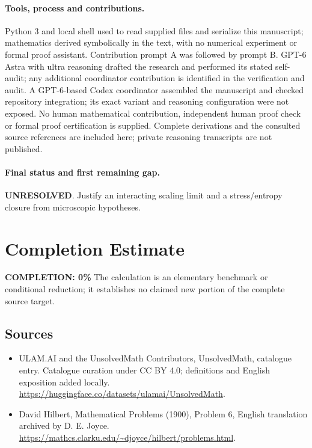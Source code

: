 \documentclass[11pt]{article}
\begin{document}
\paragraph{Tools, process and contributions.}
Python 3 and local shell used to read supplied files and serialize this manuscript; mathematics derived symbolically in the text, with no numerical experiment or formal proof assistant. Contribution prompt A was followed by prompt B. GPT-6 Astra with ultra reasoning drafted the research and performed its stated self-audit; any additional coordinator contribution is identified in the verification and audit. A GPT-6-based Codex coordinator assembled the manuscript and checked repository integration; its exact variant and reasoning configuration were not exposed. No human mathematical contribution, independent human proof check or formal proof certification is supplied. Complete derivations and the consulted source references are included here; private reasoning transcripts are not published.

\paragraph{Final status and first remaining gap.}
\textbf{UNRESOLVED}. Justify an interacting scaling limit and a stress/entropy closure from microscopic hypotheses.

\section{Completion Estimate}
\noindent\textbf{COMPLETION: 0\%}
The calculation is an elementary benchmark or conditional reduction; it establishes no claimed new portion of the complete source target.

\subsection{Sources}
\begin{itemize}
\item[\hypertarget{source:statement:1}{S1}] ULAM.AI and the UnsolvedMath Contributors, UnsolvedMath, catalogue entry. Catalogue curation under CC BY 4.0; definitions and English exposition added locally.
\url{https://huggingface.co/datasets/ulamai/UnsolvedMath}.
\item[\hypertarget{source:statement:2}{S2}] David Hilbert, Mathematical Problems (1900), Problem 6, English translation archived by D. E. Joyce.
\url{https://mathcs.clarku.edu/~djoyce/hilbert/problems.html}.
\end{itemize}
\label{end:statement}
\end{document}

